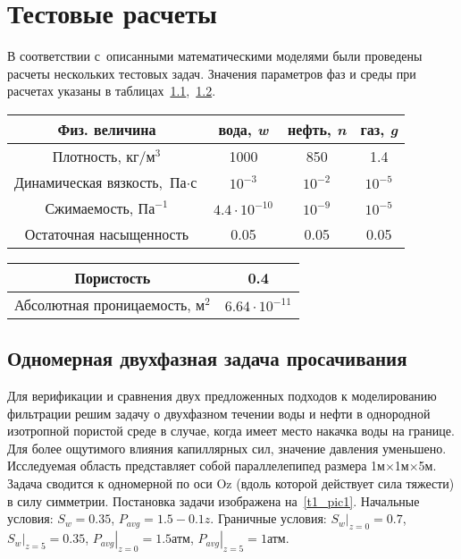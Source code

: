\chapter{Тестовые расчеты} \label{ch:ch3}

В соответствии с~описанными математическими моделями были проведены расчеты нескольких тестовых задач. Значения параметров фаз и среды при расчетах указаны в таблицах~\ref{tabular:liquids},~\ref{tabular:medium}.

\begin{table}[h]
\centering
\begin{tabular}{|c|c|c|c|}
\hline
Физ. величина & вода, \textit {w} & нефть, \textit {n} & газ, \textit {g} \\
\hline
Плотность,  $ {\text{кг}} / {\text{м}^3} $ & 1000 & 850 & 1.4 \\
\hline
Динамическая вязкость, $ \text{Па} \cdot \text{с} $ & $10^{-3}$ & $10^{-2}$ & $10^{-5}$ \\
\hline
Сжимаемость, $ \text{Па}^{-1}$ & $4.4 \cdot 10^{-10}$ & $10^{-9}$ & $10^{-5}$ \\
\hline
Остаточная насыщенность & 0.05 & 0.05 & 0.05 \\
\hline
\end{tabular}
\label{tabular:liquids}
\end{table}

\begin{table}[h]
\centering
\begin{tabular}{|c|c|}
\hline
Пористость & 0.4\\
\hline
Абсолютная проницаемость, $ \text{м}^{2}$ & $6.64 \cdot 10^{-11}$ \\
\hline
\end{tabular}
\label{tabular:medium}
\end{table}

\section{Одномерная двухфазная задача просачивания} \label{ch:ch3/sect1}

Для верификации и сравнения двух предложенных подходов к
моделированию фильтрации решим задачу о двухфазном течении воды и нефти
в однородной изотропной пористой среде в случае, когда имеет место накачка воды на границе.
Для более ощутимого влияния капиллярных сил, значение давления уменьшено.
Исследуемая область представляет собой параллелепипед размера 1м$\times$1м$\times$5м.
Задача сводится к одномерной по оси Oz (вдоль которой действует
сила тяжести) в силу симметрии. Постановка задачи изображена на~\ref{t1_pic1}.
Начальные условия: $S_w = 0.35$, $P_{avg} = 1.5 - 0.1z$.
Граничные условия: $\left.S_w\right|_{z = 0} = 0.7$, $\left.S_w\right|_{z = 5} = 0.35$, 
$\left.P_{avg}\right|_{z = 0} = 1.5 \text{атм}$, $\left.P_{avg}\right|_{z = 5} = 1 \text{атм}$.

